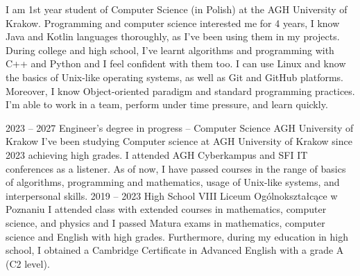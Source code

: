 \documentclass[8pt]{developercv} %
\begin{document}
\begin{minipage}[t]{0.5\textwidth} %
  \vspace{-\baselineskip}  %
  I am 1st year student of Computer Science (in Polish) at the AGH University of Krakow.
  Programming and computer science interested me for 4 years,
  I know Java and Kotlin languages thoroughly, as I’ve been using them in my projects.
  During college and high school, I’ve learnt algorithms and programming with C++ and Python and I feel confident with them too.
  I can use Linux and know the basics of Unix-like operating systems, as well as Git and GitHub platforms.
  Moreover, I know Object-oriented paradigm and standard programming practices.
  I’m able to work in a team, perform under time pressure, and learn quickly.
\end{minipage}
\hfill %
\begin{minipage}[t]{0.45\textwidth} %
	\vspace{-\baselineskip}
	\begin{barchart}{5.5}
	\end{barchart}
\end{minipage}





\begin{entrylist}
  \entry
    {2023 -- 2027}
    {Engineer's degree in progress -- Computer Science}
    {AGH University of Krakow}
    {
      I've been studying Computer science at AGH University of Krakow since 2023 achieving high grades.
      I attended AGH Cyberkampus and SFI IT conferences as a listener.
      As of now, I have passed courses in the range of basics of algorithms, programming and mathematics, usage of Unix-like systems, and interpersonal skills.
    }
  \entry
    {2019 -- 2023}
    {High School}
    {VIII Liceum Ogólnokształcące w Poznaniu}
    {
      I attended class with extended courses in mathematics, computer science, and physics and I passed Matura exams in mathematics, computer science and English with high grades.
      Furthermore, during my education in high school, I obtained a Cambridge Certificate in Advanced English with a grade A (C2 level).
    }
\end{entrylist}
\end{document}
